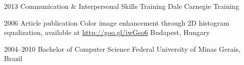 \documentclass[]{friggeri-cv}
\begin{document}
\begin{entrylist}

\entry
{2013}
{Communication \& Interpersonal {\normalfont Skills Training}}
{Dale Carnegie Training}


\entry
{2006}
{Article publication {\normalfont Color image enhancement through 2D histogram equalization, available at \url{http://goo.gl/iwGso6}}}
{Budapest, Hungary}


\entry
{2004--2010}
{{\normalfont Bachelor of} Computer Science}
{Federal University of Minas Gerais, Brazil}

\end{entrylist}




%
%
%
%
%
%
%
%
%
%
%
%
%
%
%
%
\end{document}
